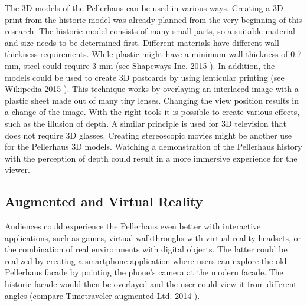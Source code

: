 The 3D models of the Pellerhaus can be used in various ways. Creating a 3D print from the historic model was already planned from the very beginning of this research. The historic model consists of many small parts, so a suitable material and size needs to be determined first. Different materials have different wall-thickness requirements. While plastic might have a minimum wall-thickness of 0.7 mm, steel could require 3 mm (see Shapeways Inc. 2015 \parencite{3dprinting_materials}). In addition, the models could be used to create 3D postcards by using lenticular printing (see Wikipedia 2015 \parencite{wiki:lenticular_printing}). This technique works by overlaying an interlaced image with a plastic sheet made out of many tiny lenses. Changing the view position results in a change of the image. With the right tools it is possible to create various effects, such as the illusion of depth. A similar principle is used for 3D television that does not require 3D glasses. Creating stereoscopic movies might be another use for the Pellerhaus 3D models. Watching a demonstration of the Pellerhaus history with the perception of depth could result in a more immersive experience for the viewer.

\subsection{Augmented and Virtual Reality}

Audiences could experience the Pellerhaus even better with interactive applications, such as games, virtual walkthroughs with virtual reality headsets, or the combination of real environments with digital objects. The latter could be realized by creating a smartphone application where users can explore the old Pellerhaus facade by pointing the phone's camera at the modern facade. The historic facade would then be overlayed and the user could view it from different angles (compare Timetraveler augmented Ltd. 2014 \parencite{ytTimeTraveler} ).

